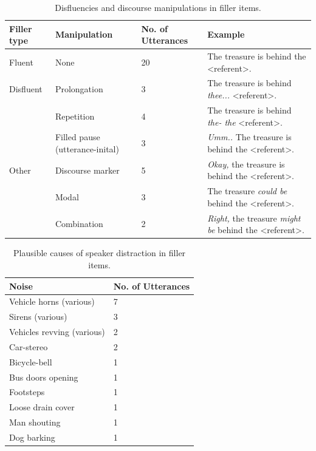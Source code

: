 \documentclass[a4paper,man,natbib]{apa6}
\begin{document}
\begin{table}
\begin{tabularx}{\linewidth}{|X|X|X|X|}
  \hline
Filler type & Manipulation & No. of Utterances & Example \\
  \hline
Fluent & None & 20 & The treasure is behind the \textless referent\textgreater . \\
Disfluent & Prolongation & 3 & The treasure is behind \textit{thee...} \textless referent\textgreater . \\
& Repetition & 4 & The treasure is behind \textit{the- the} \textless referent\textgreater .\\
& Filled pause (utterance-inital) & 3 & \textit{Umm..} The treasure is behind the \textless referent\textgreater .\\
Other & Discourse marker & 5 & \textit{Okay,} the treasure is behind the \textless referent\textgreater .\\
& Modal & 3 & The treasure \textit{could be} behind the \textless referent\textgreater .\\ 
& Combination & 2 & \textit{Right,} the treasure \textit{might be} behind the \textless referent\textgreater .\\
   \hline
\end{tabularx}
\caption{Disfluencies and discourse manipulations in filler items.}
\label{table:fillers}
\end{table}

\begin{table}
\begin{tabularx}{\linewidth}{|X|X|}
\hline
Noise & No. of Utterances\\
\hline
Vehicle horns (various) & 7 \\
Sirens (various) & 3 \\
Vehicles revving (various) & 2 \\
Car-stereo & 2 \\
Bicycle-bell & 1 \\
Bus doors opening & 1 \\
Footsteps & 1 \\
Loose drain cover & 1 \\
Man shouting & 1 \\
Dog barking & 1 \\
\hline
\end{tabularx}
\caption{Plausible causes of speaker distraction in filler items.}
\label{table:fillernoise}
\end{table}
\end{document}
